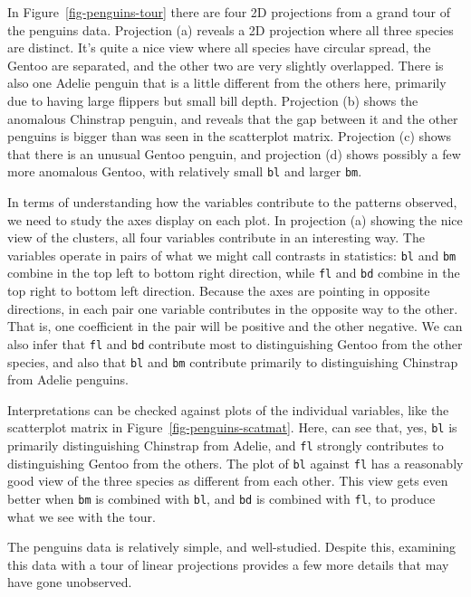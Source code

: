 \documentclass[
  letterpaper,
]{krantz}
\begin{document}
In Figure~\ref{fig-penguins-tour} there are four 2D projections from a
grand tour of the penguins data. Projection (a) reveals a 2D projection
where all three species are distinct. It's quite a nice view where all
species have circular spread, the Gentoo are separated, and the other
two are very slightly overlapped. There is also one Adelie penguin that
is a little different from the others here, primarily due to having
large flippers but small bill depth. Projection (b) shows the anomalous
Chinstrap penguin, and reveals that the gap between it and the other
penguins is bigger than was seen in the scatterplot matrix. Projection
(c) shows that there is an unusual Gentoo penguin, and projection (d)
shows possibly a few more anomalous Gentoo, with relatively small
\texttt{bl} and larger \texttt{bm}.

In terms of understanding how the variables contribute to the patterns
observed, we need to study the axes display on each plot. In projection
(a) showing the nice view of the clusters, all four variables contribute
in an interesting way. The variables operate in pairs of what we might
call contrasts in statistics: \texttt{bl} and \texttt{bm} combine in the
top left to bottom right direction, while \texttt{fl} and \texttt{bd}
combine in the top right to bottom left direction. Because the axes are
pointing in opposite directions, in each pair one variable contributes
in the opposite way to the other. That is, one coefficient in the pair
will be positive and the other negative. We can also infer that
\texttt{fl} and \texttt{bd} contribute most to distinguishing Gentoo
from the other species, and also that \texttt{bl} and \texttt{bm}
contribute primarily to distinguishing Chinstrap from Adelie penguins.

Interpretations can be checked against plots of the individual
variables, like the scatterplot matrix in
Figure~\ref{fig-penguins-scatmat}. Here, can see that, yes, \texttt{bl}
is primarily distinguishing Chinstrap from Adelie, and \texttt{fl}
strongly contributes to distinguishing Gentoo from the others. The plot
of \texttt{bl} against \texttt{fl} has a reasonably good view of the
three species as different from each other. This view gets even better
when \texttt{bm} is combined with \texttt{bl}, and \texttt{bd} is
combined with \texttt{fl}, to produce what we see with the tour.

The penguins data is relatively simple, and well-studied. Despite this,
examining this data with a tour of linear projections provides a few
more details that may have gone unobserved.
\end{document}
